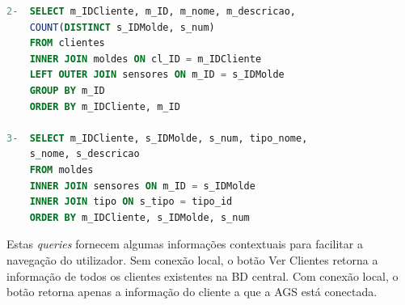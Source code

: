 \documentclass[11pt,twoside,a4paper]{report}
\begin{document}
\newpage
\begin{lstlisting}[language = SQL]
2-	SELECT m_IDCliente, m_ID, m_nome, m_descricao,
	COUNT(DISTINCT s_IDMolde, s_num)
	FROM clientes
	INNER JOIN moldes ON cl_ID = m_IDCliente
	LEFT OUTER JOIN sensores ON m_ID = s_IDMolde
	GROUP BY m_ID
	ORDER BY m_IDCliente, m_ID
	
3-	SELECT m_IDCliente, s_IDMolde, s_num, tipo_nome,
	s_nome, s_descricao
	FROM moldes
	INNER JOIN sensores ON m_ID = s_IDMolde
	INNER JOIN tipo ON s_tipo = tipo_id
	ORDER BY m_IDCliente, s_IDMolde, s_num
\end{lstlisting}
Estas \textit{queries} fornecem algumas informações contextuais para facilitar a navegação do utilizador. Sem conexão local, o botão Ver Clientes retorna a informação de todos os clientes existentes na BD central. Com conexão local, o botão retorna apenas a informação do cliente a que a AGS está conectada.
\end{document}
